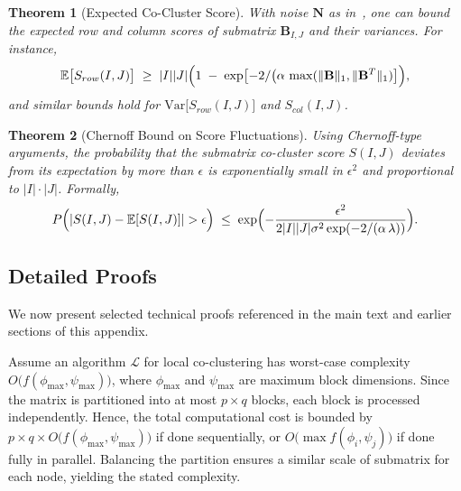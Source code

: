 \documentclass[journal]{IEEEtran}
\newtheorem{theorem}{Theorem}
\begin{document}
\begin{theorem}[Expected Co-Cluster Score]
    \label{thm:expected_cc_score}
    With noise \(\mathbf{N}\) as in~, one can bound the expected row and column scores of submatrix \(\mathbf{B}_{I,J}\) and their variances. For instance,
    \begin{equation}
        \mathbb{E}\bigl\lbrack S_{row}(I,J)\bigr\rbrack \;\ge\; |I||J|\Bigl(1\;-\;\exp\bigl\lbrack -2/\bigl(\alpha\,\max(\|\mathbf{B}\|_1,\|\mathbf{B}^T\|_1)\bigr\rbrack \Bigr),
    \end{equation}
    and similar bounds hold for \(\text{Var}\lbrack S_{row}(I,J)\rbrack \) and \(S_{col}(I,J)\).
\end{theorem}

\begin{theorem}[Chernoff Bound on Score Fluctuations]
    \label{thm:chernoff_score}
    Using Chernoff-type arguments, the probability that the submatrix co-cluster score \(S(I,J)\) deviates from its expectation by more than \(\epsilon\) is exponentially small in \(\epsilon^2\) and proportional to \(|I|\cdot|J|\). Formally,
    \begin{equation}
        P\Bigl(|S(I,J)-\mathbb{E}\lbrack S(I,J)\rbrack | > \epsilon\Bigr) \;\le\; \exp\Bigl(-\frac{\epsilon^2}{2|I||J|\sigma^2 \exp(-2/(\alpha\,\lambda))}\Bigr).
    \end{equation}
\end{theorem}

\subsection{Detailed Proofs}
\label{subsec:detailed_proofs}

We now present selected technical proofs referenced in the main text and earlier sections of this appendix.

\begin{IEEEproof}
    Assume an algorithm $\mathcal{L}$ for local co-clustering has worst-case complexity $O\bigl(f(\phi_{\max},\psi_{\max})\bigr)$, where $\phi_{\max}$ and $\psi_{\max}$ are maximum block dimensions. Since the matrix is partitioned into at most $p\times q$ blocks, each block is processed independently. Hence, the total computational cost is bounded by $p\times q \times O\bigl(f(\phi_{\max},\psi_{\max})\bigr)$ if done sequentially, or $O\bigl(\max f(\phi_i,\psi_j)\bigr)$ if done fully in parallel. Balancing the partition ensures a similar scale of submatrix for each node, yielding the stated complexity.
\end{IEEEproof}
\end{document}
